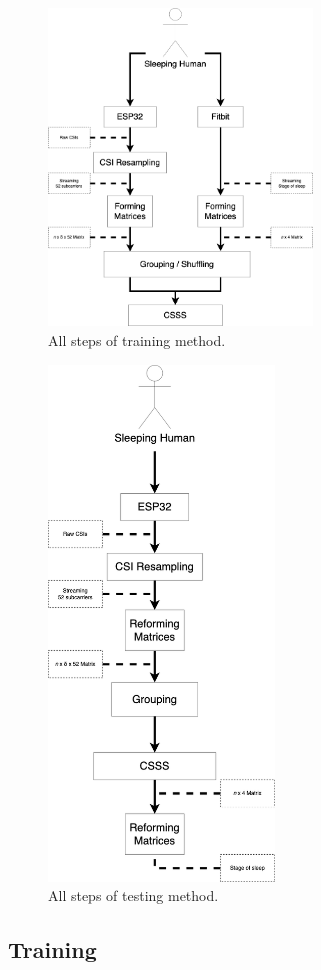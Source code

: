 \documentclass[10pt,letterpaper]{article}
\begin{document}
	
	\begin{figure}[htbp]
		\centerline{\includegraphics[width=70mm,scale=0.2]{TRAINSTEP07.png}}
		\caption{All steps of training method.}
		\label{fig:TRAINSTEP}
	\end{figure}
		\begin{figure}[htbp]
		\centerline{\includegraphics[width=60mm,scale=0.2]{TESTSTEP08.png}}
		\caption{All steps of testing method.}
		\label{fig:TESTSTEP}
	\end{figure}
	
	\subsection*{Training}
	
\end{document}
